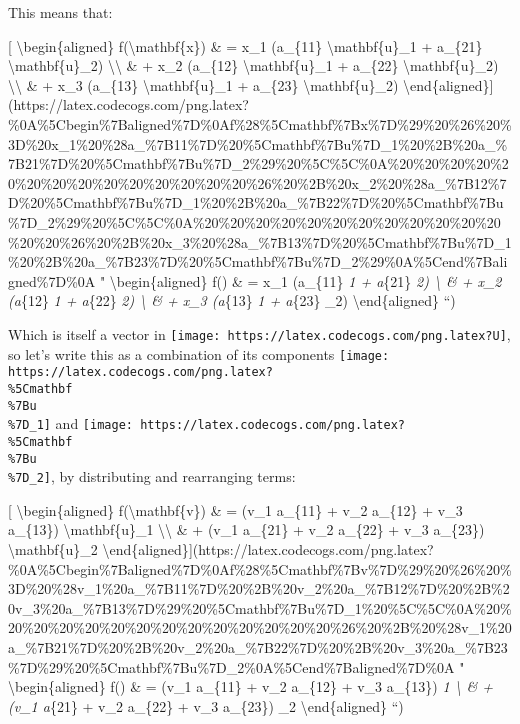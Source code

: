 \documentclass[]{article}
\begin{document}
This means that:

{[} \textbackslash{}begin\{aligned\} f(\textbackslash{}mathbf\{x\}) \& = x\_1
(a\_\{11\} \textbackslash{}mathbf\{u\}\_1 + a\_\{21\}
\textbackslash{}mathbf\{u\}\_2) \textbackslash{}\textbackslash{} \& + x\_2
(a\_\{12\} \textbackslash{}mathbf\{u\}\_1 + a\_\{22\}
\textbackslash{}mathbf\{u\}\_2) \textbackslash{}\textbackslash{} \& + x\_3
(a\_\{13\} \textbackslash{}mathbf\{u\}\_1 + a\_\{23\}
\textbackslash{}mathbf\{u\}\_2)
\textbackslash{}end\{aligned\}{]}(https://latex.codecogs.com/png.latex?\%0A\%5Cbegin\%7Baligned\%7D\%0Af\%28\%5Cmathbf\%7Bx\%7D\%29\%20\%26\%20\%3D\%20x\_1\%20\%28a\_\%7B11\%7D\%20\%5Cmathbf\%7Bu\%7D\_1\%20\%2B\%20a\_\%7B21\%7D\%20\%5Cmathbf\%7Bu\%7D\_2\%29\%20\%5C\%5C\%0A\%20\%20\%20\%20\%20\%20\%20\%20\%20\%20\%20\%20\%20\%20\%26\%20\%2B\%20x\_2\%20\%28a\_\%7B12\%7D\%20\%5Cmathbf\%7Bu\%7D\_1\%20\%2B\%20a\_\%7B22\%7D\%20\%5Cmathbf\%7Bu\%7D\_2\%29\%20\%5C\%5C\%0A\%20\%20\%20\%20\%20\%20\%20\%20\%20\%20\%20\%20\%20\%20\%26\%20\%2B\%20x\_3\%20\%28a\_\%7B13\%7D\%20\%5Cmathbf\%7Bu\%7D\_1\%20\%2B\%20a\_\%7B23\%7D\%20\%5Cmathbf\%7Bu\%7D\_2\%29\%0A\%5Cend\%7Baligned\%7D\%0A
" \textbackslash{}begin\{aligned\} f() \& = x\_1 (a\_\{11\}
\emph{1 + a}\{21\} \emph{2) \textbackslash{} \& + x\_2
(a}\{12\} \emph{1 + a}\{22\} \emph{2) \textbackslash{} \& +
x\_3 (a}\{13\} \emph{1 + a}\{23\} \_2)
\textbackslash{}end\{aligned\} ``)

Which is itself a vector in
\texttt{[image: https://latex.codecogs.com/png.latex?U]}, so let's write this as
a combination of its components
\texttt{[image: https://latex.codecogs.com/png.latex?\\\%5Cmathbf\\\%7Bu\\\%7D\_1]} and
\texttt{[image: https://latex.codecogs.com/png.latex?\\\%5Cmathbf\\\%7Bu\\\%7D\_2]}, by
distributing and rearranging terms:

{[} \textbackslash{}begin\{aligned\} f(\textbackslash{}mathbf\{v\}) \& = (v\_1
a\_\{11\} + v\_2 a\_\{12\} + v\_3 a\_\{13\}) \textbackslash{}mathbf\{u\}\_1
\textbackslash{}\textbackslash{} \& + (v\_1 a\_\{21\} + v\_2 a\_\{22\} + v\_3
a\_\{23\}) \textbackslash{}mathbf\{u\}\_2
\textbackslash{}end\{aligned\}{]}(https://latex.codecogs.com/png.latex?\%0A\%5Cbegin\%7Baligned\%7D\%0Af\%28\%5Cmathbf\%7Bv\%7D\%29\%20\%26\%20\%3D\%20\%28v\_1\%20a\_\%7B11\%7D\%20\%2B\%20v\_2\%20a\_\%7B12\%7D\%20\%2B\%20v\_3\%20a\_\%7B13\%7D\%29\%20\%5Cmathbf\%7Bu\%7D\_1\%20\%5C\%5C\%0A\%20\%20\%20\%20\%20\%20\%20\%20\%20\%20\%20\%20\%20\%20\%26\%20\%2B\%20\%28v\_1\%20a\_\%7B21\%7D\%20\%2B\%20v\_2\%20a\_\%7B22\%7D\%20\%2B\%20v\_3\%20a\_\%7B23\%7D\%29\%20\%5Cmathbf\%7Bu\%7D\_2\%0A\%5Cend\%7Baligned\%7D\%0A
" \textbackslash{}begin\{aligned\} f() \& = (v\_1 a\_\{11\} + v\_2
a\_\{12\} + v\_3 a\_\{13\}) \emph{1 \textbackslash{} \& + (v\_1
a}\{21\} + v\_2 a\_\{22\} + v\_3 a\_\{23\}) \_2
\textbackslash{}end\{aligned\} ``)
\end{document}
